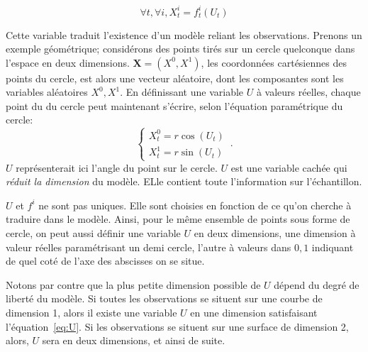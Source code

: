 \begin{equation}
\forall t, \forall i, X^i_t = f^i_t(U_t)
\label{eq:U}
\end{equation}

Cette variable traduit l'existence d'un modèle reliant les observations.
Prenons un exemple géométrique; considérons des points tirés sur un cercle quelconque dans l'espace en deux dimensions. $\mathbf{X} = (X^0,X^1)$, les coordonnées cartésiennes des points du cercle, est alors une vecteur aléatoire, dont les composantes sont les variables aléatoires $X^0,X^1$. En définissant une variable $U$ à valeurs réelles, chaque point du du cercle peut maintenant s'écrire, selon l'équation paramétrique du cercle: 
$$
 \begin{cases}
     X^0_t = r  \cos(U_t)\\
     X^1_t = r \sin(U_t)
    \end{cases}\,.
$$
$U$ représenterait ici l'angle du point sur le cercle. $U$ est une variable cachée qui \emph{réduit la dimension} du modèle. ELle contient toute l'information sur l'échantillon. 

$U$ et ${f^i}$ ne sont pas uniques. Elle sont choisies en fonction de ce qu'on cherche à traduire dans le modèle. Ainsi, pour le même ensemble de points sous forme de cercle, on peut aussi définir une variable $U$ en deux dimensions, une dimension à valeur réelles paramétrisant un demi cercle, l'autre à valeurs dans ${0,1}$ indiquant de quel coté de l'axe des abscisses on se situe.

Notons par contre que la plus petite dimension possible de $U$ dépend du degré de liberté du modèle. Si toutes les observations se situent sur une courbe de dimension 1, alors il existe une variable $U$ en une dimension satisfaisant l'équation~\ref{eq:U}. Si les observations se situent sur une surface de dimension 2, alors, $U$ sera en deux dimensions, et ainsi de suite.

